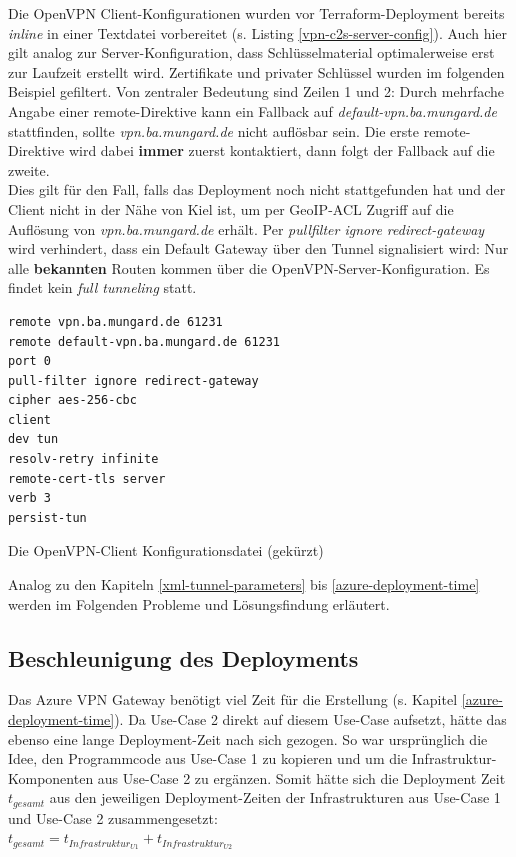 Die OpenVPN \gls{Client}-Konfigurationen wurden vor Terraform-\gls{Deployment} bereits \textit{inline} in einer Textdatei vorbereitet (s. Listing \ref{vpn-c2s-server-config}). Auch hier gilt analog zur Server-Konfiguration, dass Schlüsselmaterial optimalerweise erst zur Laufzeit erstellt wird. Zertifikate und privater Schlüssel wurden im folgenden Beispiel gefiltert. Von zentraler Bedeutung sind Zeilen 1 und 2: Durch mehrfache Angabe einer remote-Direktive kann ein Fallback auf \textit{default-vpn.ba.mungard.de} stattfinden, sollte \textit{vpn.ba.mungard.de} nicht auflösbar sein. Die erste remote-Direktive wird dabei \textbf{immer} zuerst kontaktiert, dann folgt der Fallback auf die zweite.\\
Dies gilt für den Fall, falls das \gls{Deployment} noch nicht stattgefunden hat und der \gls{Client} nicht in der Nähe von Kiel ist, um per \gls{GeoIP}-\gls{ACL} Zugriff auf die Auflösung von \textit{vpn.ba.mungard.de} erhält. Per \textit{pullfilter ignore redirect-gateway} wird verhindert, dass ein Default Gateway über den Tunnel signalisiert wird: Nur alle \textbf{bekannten} Routen kommen über die OpenVPN-Server-Konfiguration. Es findet kein \textit{full tunneling} statt.
\begin{listing}[h]
\begin{verbatim}
remote vpn.ba.mungard.de 61231
remote default-vpn.ba.mungard.de 61231
port 0
pull-filter ignore redirect-gateway
cipher aes-256-cbc
client
dev tun
resolv-retry infinite
remote-cert-tls server
verb 3
persist-tun

\end{verbatim}
\caption{Die OpenVPN-Client Konfigurationsdatei (gekürzt)}
\label{ovpn-client-conf}
\end{listing}\FloatBarrier



\newpage
Analog zu den Kapiteln \ref{xml-tunnel-parameters} bis \ref{azure-deployment-time} werden im Folgenden Probleme und Lösungsfindung erläutert.
\subsection{Beschleunigung des \gls{Deployment}s}\label{accelerate-deployment-use-case-2}
Das Azure \gls{VPN} Gateway benötigt viel Zeit für die Erstellung (s. Kapitel \ref{azure-deployment-time}). Da Use-Case 2 direkt auf diesem Use-Case aufsetzt, hätte das ebenso eine lange \gls{Deployment}-Zeit nach sich gezogen. So war ursprünglich die Idee, den Programmcode aus Use-Case 1 zu kopieren und um die Infrastruktur-Komponenten aus Use-Case 2 zu ergänzen. Somit hätte sich die \gls{Deployment} Zeit $t_{gesamt}$ aus den jeweiligen \gls{Deployment}-Zeiten der Infrastrukturen aus Use-Case 1 und Use-Case 2 zusammengesetzt:\\
$t_{gesamt} = t_{Infrastruktur_{U1}} + t_{Infrastruktur_{U2}}$


